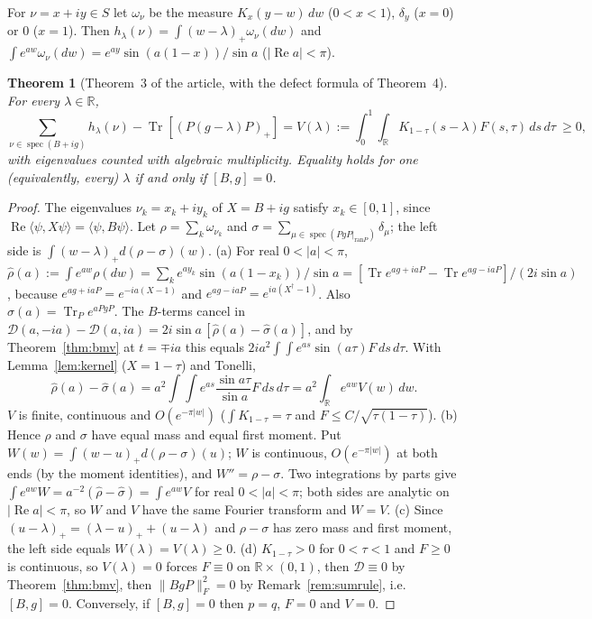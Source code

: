 \documentclass[11pt]{amsart}
\newtheorem{theorem}{Theorem}[section]
\theoremstyle{definition}
\theoremstyle{remark}
\numberwithin{equation}{section}
\newcommand{\R}{\mathbb{R}}
\newcommand{\Tr}{\operatorname{Tr}}
\newcommand{\spec}{\operatorname{spec}}
\newcommand{\cD}{\mathcal{D}}
\renewcommand{\Re}{\operatorname{Re}}
\begin{document}
For $\nu=x+iy\in S$ let $\omega_\nu$ be the measure $K_x(y-w)\,dw$ ($0<x<1$), $\delta_y$ ($x=0$) or $0$ ($x=1$). Then
$h_\lambda(\nu)=\int(w-\lambda)_+\omega_\nu(dw)$ and $\int e^{aw}\omega_\nu(dw)=e^{ay}\sin(a(1-x))/\sin a$
($|\Re a|<\pi$).

\begin{theorem}[Theorem~3 of the article, with the defect formula of Theorem~4]\label{thm:strip}
For every $\lambda\in\R$,
\[
\sum_{\nu\in\spec(B+ig)}h_\lambda(\nu)-\Tr[(P(g-\lambda)P)_+]=V(\lambda):=\int_0^1\!\!\int_\R K_{1-\tau}(s-\lambda)F(s,\tau)\,ds\,d\tau\ \ge0,
\]
with eigenvalues counted with algebraic multiplicity. Equality holds for one (equivalently, every) $\lambda$ if and only
if $[B,g]=0$.
\end{theorem}

\begin{proof}
The eigenvalues $\nu_k=x_k+iy_k$ of $X=B+ig$ satisfy $x_k\in[0,1]$, since $\Re\langle\psi,X\psi\rangle=\langle\psi,B\psi\rangle$.
Let $\rho=\sum_k\omega_{\nu_k}$ and $\sigma=\sum_{\mu\in\spec(PgP|_{\mathrm{ran}P})}\delta_\mu$; the left side is
$\int(w-\lambda)_+d(\rho-\sigma)(w)$.
(a) For real $0<|a|<\pi$, $\hat\rho(a):=\int e^{aw}\rho(dw)=\sum_ke^{ay_k}\sin(a(1-x_k))/\sin a=
[\Tr e^{ag+iaP}-\Tr e^{ag-iaP}]/(2i\sin a)$, because $e^{ag+iaP}=e^{-ia(X-1)}$ and $e^{ag-iaP}=e^{ia(X^\dagger-1)}$. Also
$\hat\sigma(a)=\Tr_Pe^{aPgP}$. The $B$-terms cancel in $\cD(a,-ia)-\cD(a,ia)=2i\sin a\,[\hat\rho(a)-\hat\sigma(a)]$, and
by Theorem~\ref{thm:bmv} at $t=\mp ia$ this equals $2ia^2\int\!\!\int e^{as}\sin(a\tau)F\,ds\,d\tau$. With
Lemma~\ref{lem:kernel} ($X=1-\tau$) and Tonelli,
\[
\hat\rho(a)-\hat\sigma(a)=a^2\int\!\!\int e^{as}\frac{\sin a\tau}{\sin a}F\,ds\,d\tau=a^2\int_\R e^{aw}V(w)\,dw .
\]
$V$ is finite, continuous and $O(e^{-\pi|w|})$ ($\int K_{1-\tau}=\tau$ and $F\le C/\sqrt{\tau(1-\tau)}$).
(b) Hence $\rho$ and $\sigma$ have equal mass and equal first moment. Put $W(w)=\int(w-u)_+d(\rho-\sigma)(u)$; $W$ is
continuous, $O(e^{-\pi|w|})$ at both ends (by the moment identities), and $W''=\rho-\sigma$. Two integrations by parts
give $\int e^{aw}W=a^{-2}(\hat\rho-\hat\sigma)=\int e^{aw}V$ for real $0<|a|<\pi$; both sides are analytic on
$|\Re a|<\pi$, so $W$ and $V$ have the same Fourier transform and $W=V$.
(c) Since $(u-\lambda)_+=(\lambda-u)_++(u-\lambda)$ and $\rho-\sigma$ has zero mass and first moment, the left side
equals $W(\lambda)=V(\lambda)\ge0$.
(d) $K_{1-\tau}>0$ for $0<\tau<1$ and $F\ge0$ is continuous, so $V(\lambda)=0$ forces $F\equiv0$ on
$\R\times(0,1)$, then $\cD\equiv0$ by Theorem~\ref{thm:bmv}, then $\|BgP\|_F^2=0$ by Remark~\ref{rem:sumrule}, i.e.
$[B,g]=0$. Conversely, if $[B,g]=0$ then $p=q$, $F=0$ and $V=0$.
\end{proof}
\end{document}
